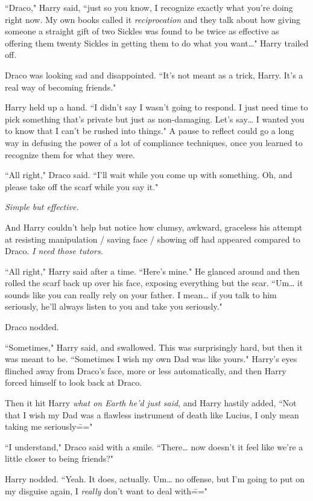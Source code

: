 ``Draco," Harry said, ``just so you know, I recognize exactly what you're doing right now. My own books called it \emph{reciprocation} and they talk about how giving someone a straight gift of two Sickles was found to be twice as effective as offering them twenty Sickles in getting them to do what you want{\ldots}" Harry trailed off.

Draco was looking sad and disappointed. ``It's not meant as a trick, Harry. It's a real way of becoming friends."

Harry held up a hand. ``I didn't say I wasn't going to respond. I just need time to pick something that's private but just as non-damaging. Let's say{\ldots} I wanted you to know that I can't be rushed into things." A pause to reflect could go a long way in defusing the power of a lot of compliance techniques, once you learned to recognize them for what they were.

``All right," Draco said. ``I'll wait while you come up with something. Oh, and please take off the scarf while you say it."

\emph{Simple but effective.}

And Harry couldn't help but notice how clumsy, awkward, graceless his attempt at resisting manipulation / saving face / showing off had appeared compared to Draco. \emph{I need those tutors.}

``All right," Harry said after a time. ``Here's mine." He glanced around and then rolled the scarf back up over his face, exposing everything but the scar. ``Um{\ldots} it sounds like you can really rely on your father. I mean{\ldots} if you talk to him seriously, he'll always listen to you and take you seriously."

Draco nodded.

``Sometimes," Harry said, and swallowed. This was surprisingly hard, but then it was meant to be. ``Sometimes I wish my own Dad was like yours." Harry's eyes flinched away from Draco's face, more or less automatically, and then Harry forced himself to look back at Draco.

Then it hit Harry \emph{what on Earth he'd just said}, and Harry hastily added, ``Not that I wish my Dad was a flawless instrument of death like Lucius, I only mean taking me seriously\==="

``I understand," Draco said with a smile. ``There{\ldots} now doesn't it feel like we're a little closer to being friends?"

Harry nodded. ``Yeah. It does, actually. Um{\ldots} no offense, but I'm going to put on my disguise again, I \emph{really} don't want to deal with\==="

